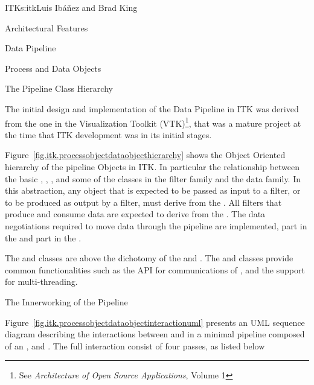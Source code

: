 \begin{aosachapter}{ITK}{s:itk}{Luis Ib\'{a}\~{n}ez and Brad King}
\begin{aosasect1}{Architectural Features}
\begin{aosasect2}{Data Pipeline}
\begin{aosasect3}{Process and Data Objects}
\end{aosasect3}

\begin{aosasect3}{The Pipeline Class Hierarchy}

The initial design and implementation of the Data Pipeline in ITK was derived
from the one in the Visualization Toolkit (VTK)\footnote{See \emph{Architecture
of Open Source Applications}, Volume 1}, that was a mature project at the time
that ITK development was in its initial stages.

Figure~\ref{fig.itk.processobjectdataobjecthierarchy} shows the Object Oriented
hierarchy of the pipeline Objects in ITK. In particular the relationship
between the basic , , , and
some of the classes in the filter family and the data family. In this
abstraction, any object that is expected to be passed as input to a filter, or
to be produced as output by a filter, must derive from the . All
filters that produce and consume data are expected to derive from the
. The data negotiations required to move data through the
pipeline are implemented, part in the  and part in the
.


The  and  classes are above the
dichotomy of the  and . The
 and  classes provide common
functionalities such as the API for communications of ,
and the support for multi-threading.

\end{aosasect3}


\begin{aosasect3}{The Innerworking of the Pipeline}


Figure~\ref{fig.itk.processobjectdataobjectinteractionuml} presents an UML
sequence diagram describing the interactions between  and
 in a minimal pipeline composed of an ,
 and . The full interaction
consist of four passes, as listed below


\end{aosasect3}
\end{aosasect2}
\end{aosasect1}
\end{aosachapter}
